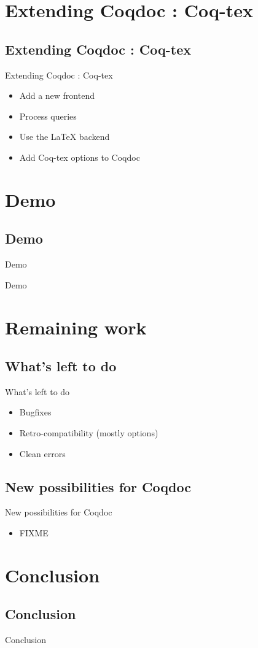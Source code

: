 \documentclass[compress]{beamer}
\newenvironment{tframe}[1]{
  \subsection{#1}
  \begin{frame}{#1}
  }{
  \end{frame}
  }
\begin{document}
\section{Extending Coqdoc : Coq-tex}
  \begin{tframe}{Extending Coqdoc : Coq-tex}
    \begin{itemize}[<+->]
      \item Add a new frontend
      \item Process queries
      \item Use the LaTeX backend
      \item Add Coq-tex options to Coqdoc
    \end{itemize}
  \end{tframe}

\section{Demo}
  \begin{tframe}{Demo}
    \begin{center}
      Demo
    \end{center}
  \end{tframe}

\section{Remaining work}
  \begin{tframe}{What's left to do}
    \begin{itemize}
      \item Bugfixes
      \item Retro-compatibility (mostly options)
      \item Clean errors
    \end{itemize}
  \end{tframe}
  \begin{tframe}{New possibilities for Coqdoc}
    \begin{itemize}
      \item FIXME
    \end{itemize}
  \end{tframe}

\section{Conclusion}
  \begin{tframe}{Conclusion}
  \end{tframe}
\end{document}
